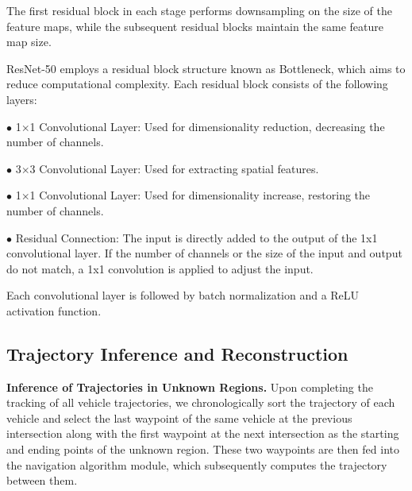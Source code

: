 \documentclass[lettersize,journal]{IEEEtran}
\begin{document}
The first residual block in each stage performs downsampling on the size of the feature maps, while the subsequent residual blocks maintain the same feature map size.

ResNet-50 employs a residual block structure known as Bottleneck, which aims to reduce computational complexity. 
Each residual block consists of the following layers:

\(\bullet\) 1\(\times\)1 Convolutional Layer: Used for dimensionality reduction, decreasing the number of channels.

\(\bullet\) 3\(\times\)3 Convolutional Layer: Used for extracting spatial features.

\(\bullet\) 1\(\times\)1 Convolutional Layer: Used for dimensionality increase, restoring the number of channels.

\(\bullet\) Residual Connection: The input is directly added to the output of the 1x1 convolutional layer. 
If the number of channels or the size of the input and output do not match, a 1x1 convolution is applied to adjust the input.

Each convolutional layer is followed by batch normalization and a ReLU activation function.

\subsection{Trajectory Inference and Reconstruction}

\textbf{Inference of Trajectories in Unknown Regions.}
Upon completing the tracking of all vehicle trajectories, we chronologically sort the trajectory of each vehicle and select the last waypoint of the same vehicle at the previous intersection along with the first waypoint at the next intersection as the starting and ending points of the unknown region. 
These two waypoints are then fed into the navigation algorithm module, which subsequently computes the trajectory between them.
\end{document}
